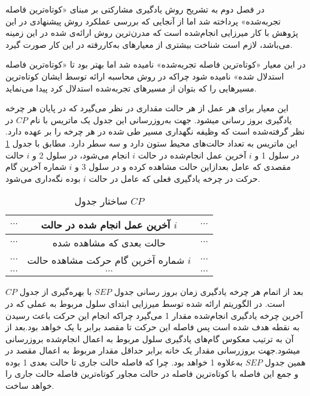 در فصل دوم به تشریح روش یادگیری مشارکتی بر مبنای «کوتاه‌ترین فاصله تجربه‌شده» پرداخته شد اما از آنجایی که بررسی عملکرد روش پیشنهادی در این پژوهش با کار میرزایی انجام‌شده است که مدرن‌ترین روش ارائه‌ی شده در این زمینه می‌باشد، لازم است شناخت بیشتری از معیارهای به‌کاررفته در این کار صورت گیرد.

در این معیار «کوتاه‌ترین فاصله تجربه‌شده» نامیده شد اما بهتر بود تا «کوتاه‌ترین فاصله استدلال شده» نامیده شود چراکه در روش محاسبه ارائه توسط ایشان کوتاه‌ترین مسیرهایی را که بتوان از مسیرهای تجربه‌شده استدلال کرد پیدا می‌نماید.

این معیار برای هر عمل از هر حالت مقداری در نظر می‌گیرد که در پایان هر چرخه یادگیری بروز رسانی میشود. جهت به‌روزرسانی این جدول یک ماتریس با نام $CP$ در نظر گرفته‌شده است که وظیفه نگهداری مسیر طی شده در هر چرخه را بر عهده دارد. این ماتریس به تعداد حالت‌های محیط ستون دارد و سه سطر دارد. مطابق با جدول \ref{tab:cp} در سلول 1 و $i$ آخرین عمل انجام‌شده در حالت $i$ انجام می‌شود، در سلول 2 و $i$ حالت مقصدی که عامل بعدازاین حالت مشاهده کرده و در سلول 3 و $i$ شماره آخرین گام حرکت در چرخه یادگیری فعلی که عامل در حالت $i$ بوده نگه‌داری می‌شود.

\begin{table}
\centering
\caption{ساختار جدول $CP$}\label{tab:cp}
\begin{tabular}{|c|c|c|}
\hline
$\cdots$ & آخرین عمل انجام شده در حالت $i$ & $\cdots$
\\\hline
$\cdots$ & حالت بعدی که مشاهده شده & $\cdots$
\\\hline
$\cdots$ & شماره آخرین گام حرکت مشاهده حالت $i$ & $\cdots$
\\\hline
$\cdots$ & $\cdots$ & $\cdots$
\\\hline
\end{tabular}
\end{table}

بعد از اتمام هر چرخه یادگیری زمان بروز رسانی جدول $SEP$ با بهره‌گیری از جدول $CP$ است. در الگوریتم ارائه شده توسط میرزایی ابتدای سلول مربوط به عملی که در آخرین چرخه یادگیری انجام‌شده مقدار 1 می‌گیرد چراکه انجام این حرکت باعث رسیدن به نقطه هدف شده است پس فاصله این حرکت تا مقصد برابر با یک خواهد بود.بعد از آن به ترتیب معکوس گام‌های یادگیری سلول مربوط به اعمال انجام‌شده بروزرسانی میشود.جهت بروزرسانی مقدار یک خانه برابر حداقل مقدار مربوط به اعمال مقصد در همین جدول $SEP$ به‌علاوه 1 خواهد بود. چرا که فاصله حالت جاری تا حالت بعدی 1 بوده و جمع این فاصله با کوتاه‌ترین فاصله در حالت مجاور کوتاه‌ترین فاصله حالت جاری را خواهد ساخت.

